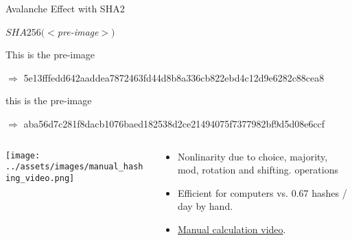 \documentclass[handout]{beamer}
\begin{document}
\begin{frame}{Avalanche Effect with SHA2}

\begin{center}
$SHA256(<$\textit{pre-image}$>)$
\end{center}

This is the pre-image

$\Rightarrow$ \footnotesize 5e13fffedd642aaddea7872463fd44d8b8a336cb822ebd4c12d9e6282c88cea8 \normalsize
\vspace{1em}

\color{focus}t\color{black}his is the pre-image

$\Rightarrow$ \footnotesize \color{focus}aba56d7c281f8d\color{black}a\color{focus}cb1076baed182538d2ce21494075f7377982bf9d5d0\color{black}8\color{focus}e6ccf\color{black} \normalsize
\vspace{1em}

\begin{columns}[T]
	\begin{column}{0.35\textwidth}
		\texttt{[image: ../assets/images/manual\_hashing\_video.png]}
	\end{column} %
	\begin{column}{0.65\textwidth}
		\begin{itemize}
			\item Nonlinarity due to choice, majority, mod, rotation and shifting. operations
			\item Efficient for computers vs. 0.67 hashes / day by hand.
			\item \link \href{https://www.youtube.com/watch?v=y3dqhixzGVo}{Manual calculation video}.
		\end{itemize}
	\end{column}
\end{columns}

	
\end{frame}
\end{document}
